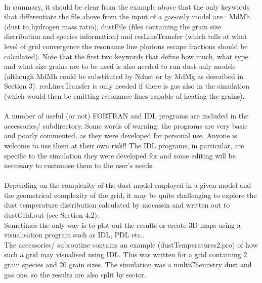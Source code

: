 \documentclass[11pt]{article}
\begin{document}
\\
   In summary, it should be clear from the example above that the only keywords that 
   differentiate the file above from the input of a gas-only model are :
   MdMh (dust to hydrogen mass ratio), dustFile (files containing the grain size 
   distribution and species information) and resLineTransfer (which tells at what level
   of grid convergence the resonance line photons escape fractions should be calculated). 
   Note that the first two keywords that define how much, what type and what size 
   grains are to be used is also needed to run dust-only models (although MdMh could be 
   substituted by Ndust or by MdMg as described in Section 3). resLinesTransfer is 
   only needed if there is gas also in the simulation (which would then be emitting 
   resonance lines capable of heating the grains).\\
   
\\
   A number of useful (or not) FORTRAN and IDL programs are included in the accessories/
   subdirectory. Some words of warning: the programs are very basic and poorly 
   commented, as they were developed for personal use. Anyone is welcome to use 
   them at their own risk!! The IDL programs, in particular, are specific to the 
   simulation they were developed for and some editing will be necessary to 
   customise them to the user's needs.\\

\\
   Depending on the complexity of the dust model employed in a given model and the 
   geometrical complexity of the grid, it may be quite challenging to explore the 
   dust temperature distribution calculated by mocassin and written out to 
   dustGrid.out (see Section 4.2). \\
   Sometimes the only way is to plot out the results or create 3D maps using a 
   visualisation program such as IDL, PDL etc.. \\
   The accessories/ subroutine contains an example (dustTemperatures2.pro) of 
   how such a grid may visualised using IDL. This was written for a grid containing 
   2 grain species and 20 grain sizes. The simulation was a multiChemistry dust 
   and gas one, so the results are also split by sector. \\


\\
\end{document}

